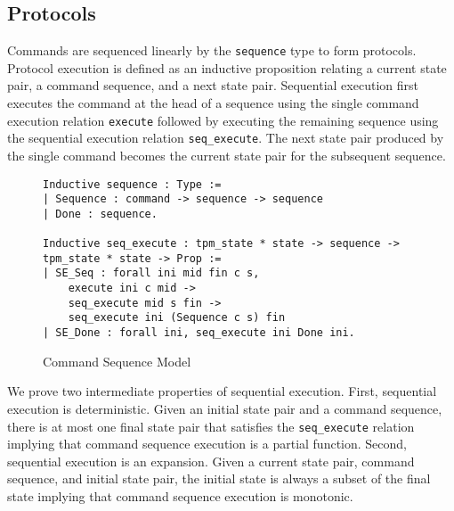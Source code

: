 \documentclass[runningheads]{llncs}
\begin{document}

\subsection{Protocols}

Commands are sequenced linearly by the \verb|sequence| type to form
protocols. Protocol execution is defined as an inductive proposition
relating a current state pair, a command sequence, and a next state
pair. Sequential execution first executes the command at the head of a
sequence using the single command execution relation \verb|execute|
followed by executing the remaining sequence using the sequential
execution relation \verb|seq_execute|. The next state pair produced by
the single command becomes the current state pair for the subsequent
sequence.

\begin{figure}[hbtp]
\begin{lstlisting}[language=Coq]
Inductive sequence : Type :=
| Sequence : command -> sequence -> sequence
| Done : sequence.

Inductive seq_execute : tpm_state * state -> sequence -> tpm_state * state -> Prop :=
| SE_Seq : forall ini mid fin c s,
    execute ini c mid ->
    seq_execute mid s fin ->
    seq_execute ini (Sequence c s) fin
| SE_Done : forall ini, seq_execute ini Done ini.
\end{lstlisting}
\caption{Command Sequence Model}
\label{fig:command-sequence-model}
\end{figure}

We prove two intermediate properties of sequential execution. First,
sequential execution is deterministic. Given an initial state pair and
a command sequence, there is at most one final state pair that
satisfies the \verb|seq_execute| relation implying that command
sequence execution is a partial function. Second, sequential execution
is an expansion. Given a current state pair, command sequence, and
initial state pair, the initial state is always a subset of the final
state implying that command sequence execution is monotonic.
\end{document}

